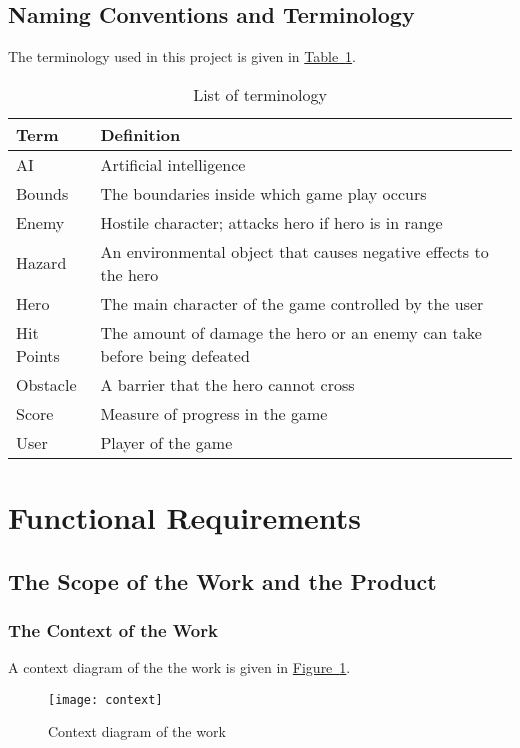 \documentclass[12pt, titlepage]{article}
\begin{document}
\subsection{Naming Conventions and Terminology}
The terminology used in this project is given in \hyperref[tab:terminology]{Table~\ref*{tab:terminology}}.
\begin{table}[h]
\caption{List of terminology} \label{tab:terminology}
\begin{tabularx}{\textwidth}{p{3cm}X}
\toprule {\bf Term} & {\bf Definition}\\
\midrule
AI & Artificial intelligence\\
Bounds & The boundaries inside which game play occurs\\
Enemy & Hostile character; attacks hero if hero is in range\\
Hazard & An environmental object that causes negative effects to the hero\\
Hero & The main character of the game controlled by the user\\
Hit Points & The amount of damage the hero or an enemy can take before being defeated\\
Obstacle & A barrier that the hero cannot cross\\
Score & Measure of progress in the game\\
User & Player of the game\\
\bottomrule
\end{tabularx}
\end{table}

\newpage
\section{Functional Requirements}
\subsection{The Scope of the Work and the Product}

\subsubsection{The Context of the Work}
A context diagram of the the work is given in \hyperref[fig:context]{Figure~\ref*{fig:context}}.

\begin{figure}[hb]
\texttt{[image: context]}
\caption{Context diagram of the work} \label{fig:context}
\end{figure}
\end{document}

